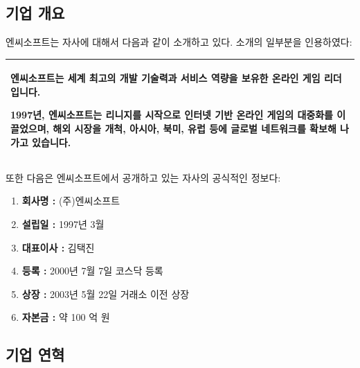 \documentclass[11pt]{oblivoir}
\newenvironment{textbox}
	{
	\begin{center}
		\begin{tabular}{|p{0.95\textwidth}|}
			\hline
	}
	{
		\\ \hline
		\end{tabular}
		\end{center}
	}
\begin{document}
		\subsection{기업 개요}
		\noindent 엔씨소프트는 자사에 대해서 다음과 같이 소개하고 있다. 소개의 일부분을 인용하였다:
		
		\begin{textbox}
			엔씨소프트는 세계 최고의 개발 기술력과 서비스 역량을 보유한 온라인 게임 리더입니다.
			
			1997년, 엔씨소프트는 리니지를 시작으로 인터넷 기반 온라인 게임의 대중화를 이끌었으며, 해외 시장을 개척, 아시아, 북미, 유럽 등에 글로벌 네트워크를 확보해 나가고 있습니다.
		\end{textbox} 
		\pagebreak
		
		\noindent 또한 다음은 엔씨소프트에서 공개하고 있는 자사의 공식적인 정보다:
		\begin{enumerate}
			\item \textbf{회사명 :} (주)엔씨소프트
			\item \textbf{설립일 :} 1997년 3월
  			\item \textbf{대표이사 :} 김택진
			\item \textbf{등록 :} 2000년 7월 7일 코스닥 등록 
			\item \textbf{상장 :} 2003년 5월 22일 거래소 이전 상장
			\item \textbf{자본금 :} 약 100 억 원
		\end{enumerate}
		
		\subsection{기업 연혁}
			\noindent
			
\end{document}
